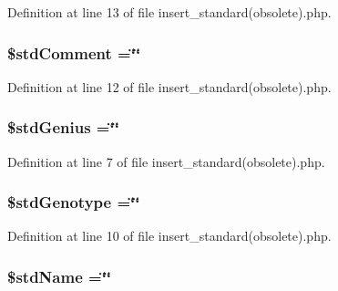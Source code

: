 Definition at line 13 of file insert\-\_\-standard(obsolete).\-php.

\hypertarget{insert__standard_07obsolete_08_8php_a57ad1d0043a566efde8a4fb592d52b18}{
\subsubsection[{\$std\-Comment}]{\setlength{\rightskip}{0pt plus 5cm}\$std\-Comment =\char`\"{}\char`\"{}}}\label{insert__standard_07obsolete_08_8php_a57ad1d0043a566efde8a4fb592d52b18}


Definition at line 12 of file insert\-\_\-standard(obsolete).\-php.

\hypertarget{insert__standard_07obsolete_08_8php_a8964a2785066a92d7c0b11ff5a0261ea}{
\subsubsection[{\$std\-Genius}]{\setlength{\rightskip}{0pt plus 5cm}\$std\-Genius =\char`\"{}\char`\"{}}}\label{insert__standard_07obsolete_08_8php_a8964a2785066a92d7c0b11ff5a0261ea}


Definition at line 7 of file insert\-\_\-standard(obsolete).\-php.

\hypertarget{insert__standard_07obsolete_08_8php_a26327dd0b8e0254d4910cf94160bb302}{
\subsubsection[{\$std\-Genotype}]{\setlength{\rightskip}{0pt plus 5cm}\$std\-Genotype =\char`\"{}\char`\"{}}}\label{insert__standard_07obsolete_08_8php_a26327dd0b8e0254d4910cf94160bb302}


Definition at line 10 of file insert\-\_\-standard(obsolete).\-php.

\hypertarget{insert__standard_07obsolete_08_8php_a04bd6b914feb54eeeb053d3f690fea50}{
\subsubsection[{\$std\-Name}]{\setlength{\rightskip}{0pt plus 5cm}\$std\-Name =\char`\"{}\char`\"{}}}\label{insert__standard_07obsolete_08_8php_a04bd6b914feb54eeeb053d3f690fea50}


